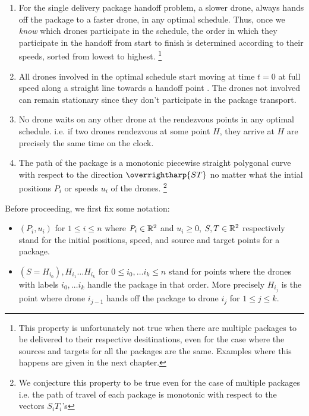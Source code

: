 \documentclass[12.0pt]{report}
\begin{document}
\begin{flem}

\begin{enumerate}

   \item  For the single delivery package handoff problem,  a slower drone, 
          always hands off the package to a faster drone, in any optimal schedule. 
          Thus, once we \textit{know} which drones participate in the schedule, the order in which they participate in the handoff
          from start to finish is determined according to their speeds, sorted from lowest to highest. 
\footnote{This property is unfortunately 
not true when there are multiple packages to be delivered to their respective desitinations, even for the case where the sources
and targets for all the packages are the same. Examples where this happens are given in the next chapter.}
   
    \item All drones involved in the optimal schedule start moving at time $t=0$ at full speed along a straight line towards a handoff point . The drones not involved 
          can remain stationary since they don't participate in the package transport. 
    
    \item No drone waits on any other drone at the rendezvous points in any optimal schedule. i.e. if two drones rendezvous at some 
          point $H$, they arrive at $H$ are precisely the same time on the clock. 

    \item The path of the package is a monotonic piecewise straight polygonal curve with respect to the direction $\overrightharp{ST}$
          no matter what the intial positions $P_i$ or speeds $u_i$ of the drones. \footnote{We conjecture this property to be true 
          even for the case of multiple packages i.e. the path of travel of each package is monotonic with respect to the vectors $S_i T_i$'s}
\end{enumerate}


 \end{flem}


Before proceeding, we first fix some notation: 

\begin{itemize}
\item $(P_i, u_i)$ for $1 \leq i \leq n$ where $P_i \in \mathbb{R}^2$ and $u_i \geq 0$, $S,T \in \mathbb{R}^2$ respectively stand for the initial positions, speed, and source and target points for a package. 
\item $(S=H_{i_0}), H_{i_1} \ldots H_{i_k}$ for $0 \leq i_0, \ldots i_k \leq n$ stand for points where the drones with labels $i_0, \ldots i_k$ handle the package in that order. More precisely 
      $H_{i_j}$ is the point where drone $i_{j-1}$ hands off the package to drone $i_j$ for $1 \leq j \leq k$.  
\end{itemize}
\end{document}

